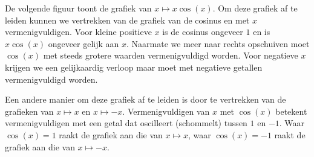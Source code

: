 \begin{center}
\end{center}

De volgende figuur toont de grafiek van $x\mapsto x \cos(x)$. Om deze grafiek
af te leiden kunnen we vertrekken van de grafiek van de cosinus en met
$x$ vermenigvuldigen. Voor kleine positieve $x$ is de cosinus ongeveer
$1$ en is $x\cos(x)$ ongeveer gelijk aan $x$. Naarmate we
meer naar rechts opschuiven moet $\cos(x)$ met steeds grotere waarden
vermenigvuldigd worden. Voor negatieve $x$ krijgen we een gelijkaardig
verloop maar moet met negatieve getallen vermenigvuldigd worden.

Een andere manier om deze grafiek af te leiden is door te vertrekken
van de grafieken van $x\mapsto x$ en $x\mapsto -x$. Vermenigvuldigen
van $x$ met $\cos(x)$ betekent vermenigvuldigen met een getal dat
oscilleert (schommelt) tussen $1$ en $-1$. Waar $\cos(x)=1$ raakt de
grafiek aan die van $x\mapsto x$, waar $\cos(x)=-1$ raakt de grafiek
aan die van $x\mapsto -x$.

\begin{center}
\end{center}

